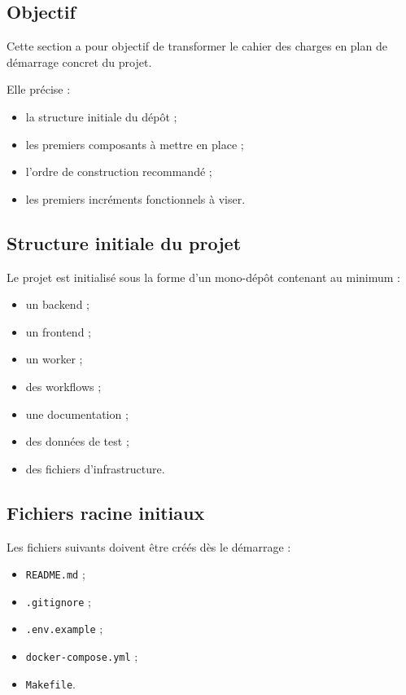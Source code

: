 \documentclass[11pt,a4paper]{article}
\begin{document}
\subsection{Objectif}

Cette section a pour objectif de transformer le cahier des charges en plan de démarrage concret du projet.

Elle précise :

\begin{itemize}
    \item la structure initiale du dépôt ;
    \item les premiers composants à mettre en place ;
    \item l’ordre de construction recommandé ;
    \item les premiers incréments fonctionnels à viser.
\end{itemize}

\subsection{Structure initiale du projet}

Le projet est initialisé sous la forme d’un mono-dépôt contenant au minimum :

\begin{itemize}
    \item un backend ;
    \item un frontend ;
    \item un worker ;
    \item des workflows ;
    \item une documentation ;
    \item des données de test ;
    \item des fichiers d’infrastructure.
\end{itemize}

\subsection{Fichiers racine initiaux}

Les fichiers suivants doivent être créés dès le démarrage :

\begin{itemize}
    \item \texttt{README.md} ;
    \item \texttt{.gitignore} ;
    \item \texttt{.env.example} ;
    \item \texttt{docker-compose.yml} ;
    \item \texttt{Makefile}.
\end{itemize}
\end{document}
